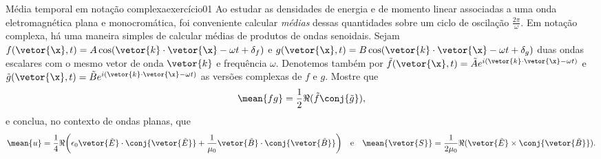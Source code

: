 \begin{exercício}{Média temporal em notação complexa}{exercício01}
    Ao estudar as densidades de energia e de momento linear associadas a uma onda eletromagnética plana e monocromática, foi conveniente calcular \emph{médias} dessas quantidades sobre um ciclo de oscilação \(\frac{2\pi}{\omega}\). Em notação complexa, há uma maneira simples de calcular médias de produtos de ondas senoidais. Sejam \(f(\vetor{\x}, t) = A \cos(\vetor{k}\cdot \vetor{\x} - \omega t + \delta_f)\) e \(g(\vetor{\x}, t) = B \cos(\vetor{k}\cdot \vetor{\x} - \omega t + \delta_g)\) duas ondas escalares com o mesmo vetor de onda \(\vetor{k}\) e frequência \(\omega\). Denotemos também por \(\tilde{f}(\vetor{\x}, t) = \tilde{A} e^{i(\vetor{k}\cdot\vetor{\x} - \omega t)}\) e \(\tilde{g}(\vetor{\x}, t) = \tilde{B} e^{i(\vetor{k}\cdot \vetor{\x} - \omega t)}\) as versões complexas de \(f\) e \(g\). Mostre que
    \begin{equation*}
        \mean{fg} = \frac12 \Re{(\tilde{f} \conj{\tilde{g}})},
    \end{equation*}
    e conclua, no contexto de ondas planas, que
    \begin{equation*}
        \mean{u} = \frac14 \Re{\left(\epsilon_0 \vetor{\tilde{E}} \cdot \conj{\vetor{\tilde{E}}} + \frac1{\mu_0} \vetor{\tilde{B}}\cdot \conj{\vetor{\tilde{B}}}\right)}
        \quad\text{e}\quad
        \mean{\vetor{S}} = \frac1{2\mu_0} \Re(\vetor{\tilde{E}}\times \conj{\vetor{\tilde{B}}}).
    \end{equation*}
\end{exercício}
